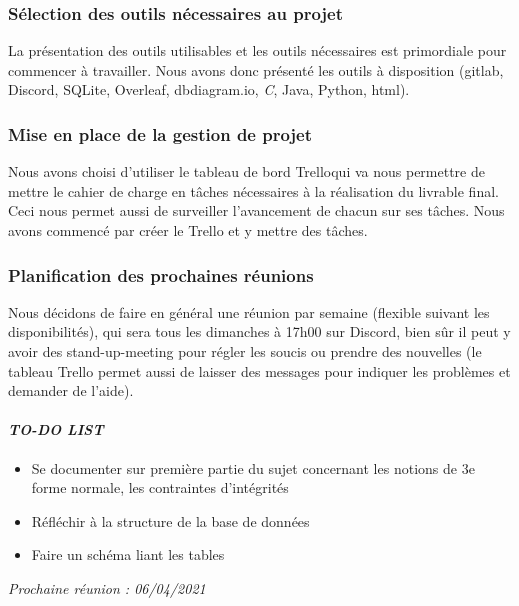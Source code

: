 
\subsubsection*{Sélection des outils nécessaires au projet}
La présentation des outils utilisables et les outils nécessaires est primordiale pour commencer à travailler. Nous avons donc présenté les outils à disposition (\textsf{gitlab}, \textsf{Discord}, \textsf{SQLite}, \textsf{Overleaf}, \textsf{dbdiagram.io}, \textsl{C}, \textsf{Java}, \textsf{Python}, \textsf{html}).

\subsubsection*{Mise en place de la gestion de projet}
Nous avons choisi d'utiliser le tableau de bord Trello\footnotemark qui va nous permettre de mettre le cahier de charge en tâches nécessaires à la réalisation du livrable final. Ceci nous permet aussi de surveiller l'avancement de chacun sur ses tâches. Nous avons commencé par créer le Trello et y mettre des tâches.

\subsubsection*{Planification des prochaines réunions}
Nous décidons de faire en général une réunion par semaine (flexible suivant les disponibilités), qui sera tous les dimanches à 17h00 sur Discord, bien sûr il peut y avoir des stand-up-meeting pour régler les soucis ou prendre des nouvelles (le tableau Trello permet aussi de laisser des messages pour indiquer les problèmes et demander de l'aide).

\paragraph{\emph{TO-DO LIST}}
\begin{itemize}
    \item Se documenter sur première partie du sujet concernant les notions de 3e forme normale, les contraintes d'intégrités
    \item Réfléchir à la structure de la base de données
    \item Faire un schéma liant les tables
\end{itemize}

\emph{Prochaine réunion : 06/04/2021}\\

% 